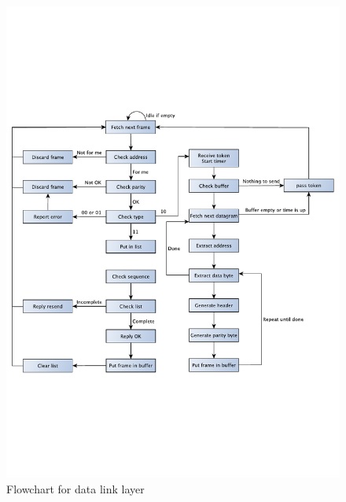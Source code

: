 \documentclass[letterpaper]{article}
\begin{document}
\begin{figure}[htb]
	\begin{center}
	\includegraphics[scale=0.5,trim=0 0 0
	0]{content/graphics/dll_flowchart.pdf}
	\caption{Flowchart for data link layer}
	\label{Flowchart for data link layer}	
	\end{center}
\end{figure}
\end{document}
